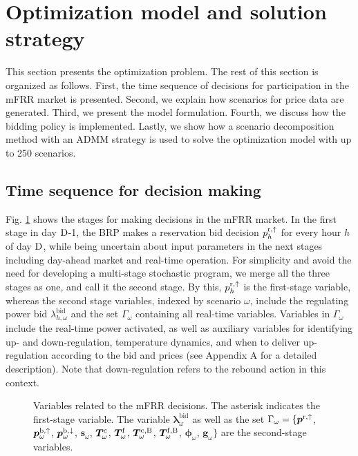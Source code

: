 \section{Optimization model and solution strategy}\label{sec:OptimizationModel}
%
This section presents the optimization problem. The rest of this section is organized as follows. First, the time sequence of decisions for participation in the mFRR market is presented. Second, we explain how scenarios for price data are generated. Third, we present the model formulation. Fourth, we discuss how the bidding policy is implemented. Lastly, we show how a scenario decomposition method with an ADMM strategy is used to solve the optimization model with up to 250 scenarios.

\vspace{-1mm}
\subsection{Time sequence for decision making}
Fig. \ref{fig:timeline_mfrr_variables} shows the stages for making decisions in the mFRR market. In the first stage in day $\rm{D}$-1, the BRP makes a reservation bid decision $p_{h}^{\rm{r},\uparrow}$ for every hour $h$ of day $\rm{D}$,  while being uncertain about input parameters in the next stages including day-ahead market and real-time operation. For simplicity and avoid the need for developing a multi-stage stochastic program, we merge all the three stages as one, and call it the second stage. By this, $p_{h}^{\rm{r},\uparrow}$ is the first-stage variable, whereas the second stage variables, indexed by scenario $\omega$, include
the regulating power bid $\lambda_{h,\omega}^{\text{bid}}$ and the set $\Gamma_{\omega}$ containing all real-time variables. Variables in $\Gamma_{\omega}$ include the real-time power activated, as well as auxiliary variables for identifying up- and down-regulation,  temperature dynamics, and when to deliver up-regulation according to the bid and prices (see Appendix A for a detailed description). Note that down-regulation refers to the rebound action in this context.

\begin{figure}[b]
    \centering
    
    \caption{Variables related to the mFRR  decisions. The asterisk indicates the first-stage variable.  The variable $\bm{\lambda}_{\omega}^{\text{bid}}$ as well as the set $\Gamma_{\omega} = \{ \bm{p}^{\rm{r},\uparrow}$, $\bm{p}_{\omega}^{\rm{b},\uparrow}$, $\bm{p}_{\omega}^{\rm{b},\downarrow}$, $\bm{s}_{\omega}$, $\bm{T}_{\omega}^{\rm{c}}$, $\bm{T}_{\omega}^{\rm{f}}$, $\bm{T}_{\omega}^{\rm{c,B}}$, $\bm{T}_{\omega}^{\rm{f,B}}$, $\bm{\phi}_{\omega}$, $\bm{g}_{\omega} \}$ are the second-stage  variables.}
    \label{fig:timeline_mfrr_variables}
\end{figure}

